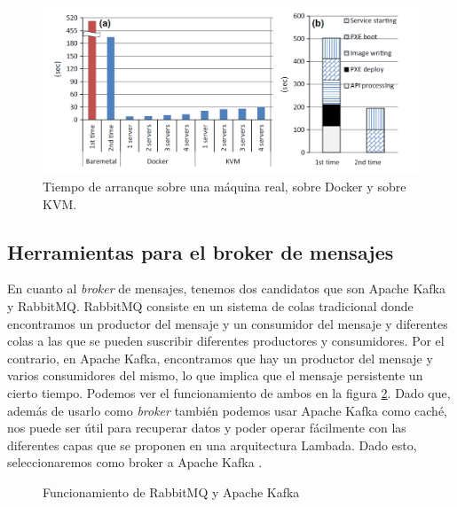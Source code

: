\begin{figure}[htp]
\centering
\includegraphics[scale=0.40]{Imagenes/dockervsvm3.png}
\caption{Tiempo de arranque sobre una máquina real, sobre Docker y sobre
  KVM.}
\label{dock-3}
\end{figure}

\subsection{Herramientas para el broker de mensajes\label{hbrok}}

En cuanto al \emph{broker} de mensajes, tenemos dos candidatos que son
Apache Kafka y RabbitMQ. RabbitMQ consiste en un sistema de colas
tradicional donde encontramos un productor del mensaje y un consumidor del
mensaje y diferentes colas a las que se pueden suscribir diferentes
productores y consumidores. Por el contrario, en Apache Kafka, encontramos
que hay un productor del mensaje y varios consumidores del mismo, lo que
implica que el mensaje persistente un cierto tiempo. Podemos ver el
funcionamiento de ambos en la figura \ref{brokers-img}. Dado que, además de
usarlo como \emph{broker} también podemos usar Apache Kafka como caché, nos
puede ser útil para recuperar datos y poder operar fácilmente con las
diferentes capas que se proponen en una arquitectura Lambada. Dado esto,
seleccionaremos como broker a Apache Kafka \cite{Hrr-2}.

\begin{figure}[htp]
\centering
{}
\caption{Funcionamiento de RabbitMQ y Apache Kafka}
\label{brokers-img}
\end{figure}

